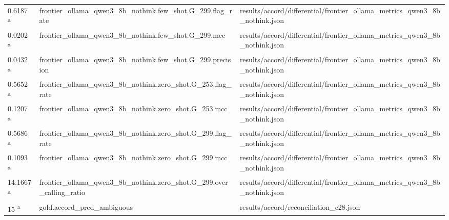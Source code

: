 \begin{longtable}{@{}p{0.7in}p{1.9in}p{2.6in}@{}}
0.6187 \textsuperscript{a} & frontier\_ollama\_qwen3\_8b\_nothink.\allowbreak{}few\_shot.\allowbreak{}G\_299.\allowbreak{}flag\_rate & results/\allowbreak{}accord/\allowbreak{}differential/\allowbreak{}frontier\_ollama\_metrics\_qwen3\_8b\_nothink.\allowbreak{}json\\
0.0202 \textsuperscript{a} & frontier\_ollama\_qwen3\_8b\_nothink.\allowbreak{}few\_shot.\allowbreak{}G\_299.\allowbreak{}mcc & results/\allowbreak{}accord/\allowbreak{}differential/\allowbreak{}frontier\_ollama\_metrics\_qwen3\_8b\_nothink.\allowbreak{}json\\
0.0432 \textsuperscript{a} & frontier\_ollama\_qwen3\_8b\_nothink.\allowbreak{}few\_shot.\allowbreak{}G\_299.\allowbreak{}precision & results/\allowbreak{}accord/\allowbreak{}differential/\allowbreak{}frontier\_ollama\_metrics\_qwen3\_8b\_nothink.\allowbreak{}json\\
0.5652 \textsuperscript{a} & frontier\_ollama\_qwen3\_8b\_nothink.\allowbreak{}zero\_shot.\allowbreak{}G\_253.\allowbreak{}flag\_rate & results/\allowbreak{}accord/\allowbreak{}differential/\allowbreak{}frontier\_ollama\_metrics\_qwen3\_8b\_nothink.\allowbreak{}json\\
0.1207 \textsuperscript{a} & frontier\_ollama\_qwen3\_8b\_nothink.\allowbreak{}zero\_shot.\allowbreak{}G\_253.\allowbreak{}mcc & results/\allowbreak{}accord/\allowbreak{}differential/\allowbreak{}frontier\_ollama\_metrics\_qwen3\_8b\_nothink.\allowbreak{}json\\
0.5686 \textsuperscript{a} & frontier\_ollama\_qwen3\_8b\_nothink.\allowbreak{}zero\_shot.\allowbreak{}G\_299.\allowbreak{}flag\_rate & results/\allowbreak{}accord/\allowbreak{}differential/\allowbreak{}frontier\_ollama\_metrics\_qwen3\_8b\_nothink.\allowbreak{}json\\
0.1093 \textsuperscript{a} & frontier\_ollama\_qwen3\_8b\_nothink.\allowbreak{}zero\_shot.\allowbreak{}G\_299.\allowbreak{}mcc & results/\allowbreak{}accord/\allowbreak{}differential/\allowbreak{}frontier\_ollama\_metrics\_qwen3\_8b\_nothink.\allowbreak{}json\\
14.1667 \textsuperscript{a} & frontier\_ollama\_qwen3\_8b\_nothink.\allowbreak{}zero\_shot.\allowbreak{}G\_299.\allowbreak{}over\_calling\_ratio & results/\allowbreak{}accord/\allowbreak{}differential/\allowbreak{}frontier\_ollama\_metrics\_qwen3\_8b\_nothink.\allowbreak{}json\\
15 \textsuperscript{a} & gold.\allowbreak{}accord\_pred\_ambiguous & results/\allowbreak{}accord/\allowbreak{}reconciliation\_c28.\allowbreak{}json\\

\end{longtable}
